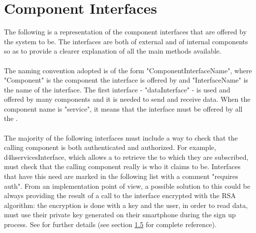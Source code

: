 \documentclass[../../DD.tex]{subfiles}
\begin{document}
\section{Component Interfaces\label{sect2.5}}

The following is a representation of the component interfaces that are offered by the system to be. The interfaces are both of external and of internal components so as to provide a clearer explanation of all the main methods available.\\\\
The naming convention adopted is of the form "Component\textunderscore InterfaceName", where "Component" is the component the interface is offered by and "InterfaceName" is the name of the interface. The first interface - "dataInterface" - is used and offered by many components and it is needed to send and receive data. When the component name is "service", it means that the interface must be offered by all the .\\\\
The majority of the following interfaces must include a way to check that the calling component is both authenticated and authorized. For example, d4h\textunderscore servicesInterface, which allows a  to retrieve the  to which they are subscribed, must check that the calling component really is who it claims to be. Interfaces that have this need are marked in the following list with a comment "requires auth". From an implementation point of view, a possible solution to this could be always providing the result of a call to the interface encrypted with the RSA algorithm: the encryption is done with a key and the user, in order to read data, must use their private key generated on their smartphone during the sign up process. See  for further details (see section \hyperref[sect:1.5]{1.5} for complete reference).
\end{document}
